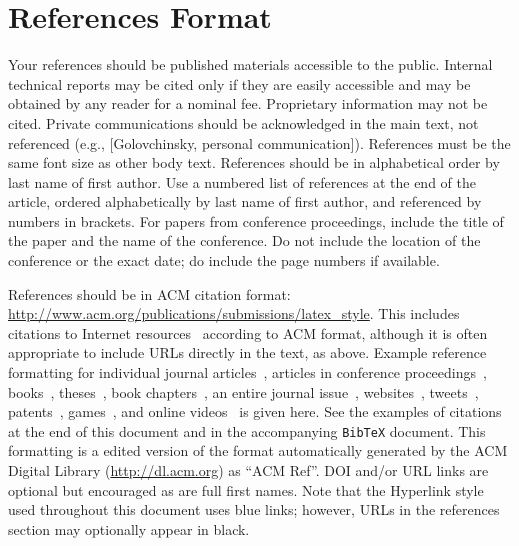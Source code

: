 \documentclass{sigchi-ext}
\begin{document}
\section{References Format}
Your references should be published materials accessible to the
public. Internal technical reports may be cited only if they are
easily accessible and may be obtained by any reader for a nominal
fee. Proprietary information may not be cited. Private communications
should be acknowledged in the main text, not referenced (e.g.,
[Golovchinsky, personal communication]). References must be the same
font size as other body text. References should be in alphabetical
order by last name of first author. Use a numbered list of references
at the end of the article, ordered alphabetically by last name of
first author, and referenced by numbers in brackets. For papers from
conference proceedings, include the title of the paper and the name of
the conference. Do not include the location of the conference or the
exact date; do include the page numbers if available. 

References should be in ACM citation format:
\url{http://www.acm.org/publications/submissions/latex_style}.  This
includes citations to Internet
resources~\cite{CHINOSAUR:venue,cavender:writing,psy:gangnam}
according to ACM format, although it is often appropriate to include
URLs directly in the text, as above. Example reference formatting for
individual journal articles~\cite{ethics}, articles in conference
proceedings~\cite{Klemmer:2002:WSC:503376.503378},
books~\cite{Schwartz:1995:GBF}, theses~\cite{sutherland:sketchpad},
book chapters~\cite{winner:politics}, an entire journal
issue~\cite{kaye:puc},
websites~\cite{acm_categories,cavender:writing},
tweets~\cite{CHINOSAUR:venue}, patents~\cite{heilig:sensorama}, 
games~\cite{supermetroid:snes}, and
online videos~\cite{psy:gangnam} is given here.  See the examples of
citations at the end of this document and in the accompanying
\texttt{BibTeX} document. This formatting is a edited version of the
format automatically generated by the ACM Digital Library
(\url{http://dl.acm.org}) as ``ACM Ref''. DOI and/or URL links are
optional but encouraged as are full first names. Note that the
Hyperlink style used throughout this document uses blue links;
however, URLs in the references section may optionally appear in
black.

\balance{} 



\end{document}
